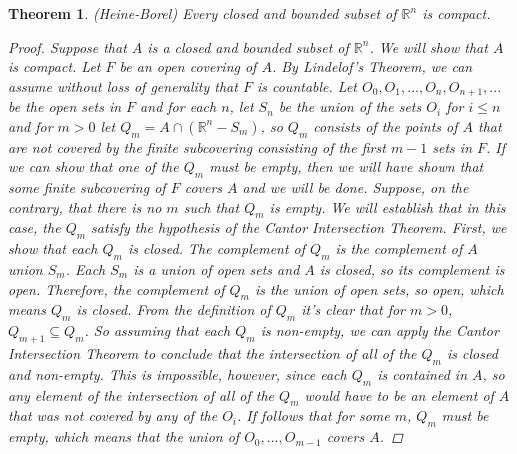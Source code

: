 \documentclass[11pt,a4paper]{report}
\theoremstyle{plain}
\newtheorem{thm}{Theorem}[section]
\theoremstyle{definition}
\theoremstyle{remark}
\begin{document}
\begin{thm}{(Heine-Borel)}
Every closed and bounded subset of $\mathbb{R}^n$ is compact.
\begin{proof}
Suppose that $A$ is a closed and bounded subset of $\mathbb{R}^n$.  We will show that $A$ is compact.  Let $F$ be an open covering of $A$.  By Lindelof's Theorem, we can assume without loss of generality that $F$ is countable.  Let $O_0, O_1, ..., O_n, O_{n+1}, ...$ be the open sets in $F$ and for each $n$, let $S_n$ be the union of the sets $O_i$ for $i \leq n$ and for $m > 0$ let $Q_m = A \cap (\mathbb{R}^n - S_m)$, so $Q_m$ consists of the points of $A$ that are not covered by the finite subcovering consisting of the first $m -1$ sets in $F$.  If we can show that one of the $Q_m$ must be empty, then we will have shown that some finite subcovering of $F$ covers $A$ and we will be done.  Suppose, on the contrary, that there is no $m$ such that $Q_m$ is empty.  We will establish that in this case, the $Q_m$ satisfy the hypothesis of the Cantor Intersection Theorem. First, we show that each $Q_m$ is closed. The complement of $Q_m$ is the complement of $A$ union $S_m$. Each $S_m$ is a union of open sets and $A$ is closed, so its complement is open.  Therefore, the complement of $Q_m$ is the union of open sets, so open, which means $Q_m$ is closed.  From the definition of $Q_m$ it's clear that for $m > 0$, $Q_{m+1} \subseteq Q_m$.  So assuming that each $Q_m$ is non-empty, we can apply the Cantor Intersection Theorem to conclude that the intersection of all of the $Q_m$ is closed and non-empty.  This is impossible, however, since each $Q_m$ is contained in $A$, so any element of the intersection of all of the $Q_m$ would have to be an element of $A$ that was not covered by any of the $O_i$. If follows that for some $m$, $Q_m$ must be empty, which means that the union of $O_0, ..., O_{m-1}$ covers $A$.
\end{proof}
\end{thm}
\end{document}
